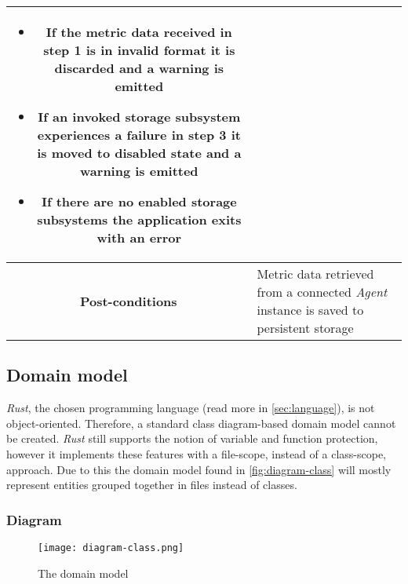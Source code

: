 \begin{longtable}{ |c|p{11.8cm}| }
                    \begin{itemize}
                        \item If the metric data received in step 1 is in invalid format it is discarded and a warning is emitted
                        \item If an invoked storage subsystem experiences a failure in step 3 it is moved to disabled state and a warning is emitted
                        \item If there are no enabled storage subsystems the application exits with an error
                    \end{itemize}\\ \hline
                \cellcolor[gray]{0.9} \textbf{Post-conditions} & Metric data retrieved from a connected \textit{Agent} instance is saved to persistent storage\\ \hline
            \end{longtable}
    
    \subsection{Domain model}
        \textit{Rust}, the chosen programming language (read more in \autoref{sec:language}), is not object-oriented. Therefore, a standard class diagram-based domain model cannot be created. \textit{Rust} still supports the notion of variable and function protection, however it implements these features with a file-scope, instead of a class-scope, approach. Due to this the domain model found in \autoref{fig:diagram-class} will mostly represent entities grouped together in files instead of classes.

        \subsubsection{Diagram}
            \begin{center}
                \begin{figure}[!h]
                    \texttt{[image: diagram-class.png]}
                    \caption{The domain model}
                    \label{fig:diagram-class}
                \end{figure}
            \end{center}
